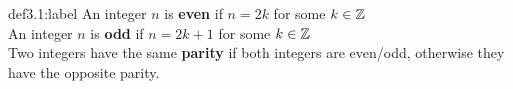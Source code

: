 

\begin{definition}{def3.1:label}
    An integer $n$ is \textbf{even} if $n=2k$ for some $k \in \mathbb{Z}$\\

    An integer $n$ is \textbf{odd} if $n=2k+1$ for some $k \in \mathbb{Z}$\\

    Two integers have the same \textbf{parity} if both integers are even/odd, otherwise they have the opposite parity.
\end{definition}

